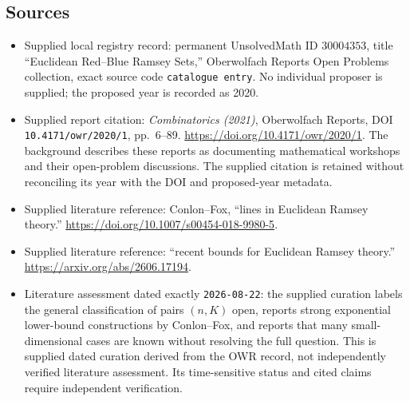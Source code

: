 \documentclass[11pt]{article}
\begin{document}
\subsection{Sources}
\begin{itemize}
\item Supplied local registry record: permanent UnsolvedMath ID \(30004353\), title ``Euclidean Red--Blue Ramsey Sets,'' Oberwolfach Reports Open Problems collection, exact source code \texttt{catalogue entry}. No individual proposer is supplied; the proposed year is recorded as 2020.
\item Supplied report citation: \emph{Combinatorics (2021)}, Oberwolfach Reports, DOI \texttt{10.4171/owr/2020/1}, pp.\ 6--89. \url{https://doi.org/10.4171/owr/2020/1}. The background describes these reports as documenting mathematical workshops and their open-problem discussions. The supplied citation is retained without reconciling its year with the DOI and proposed-year metadata.
\item Supplied literature reference: Conlon--Fox, ``lines in Euclidean Ramsey theory.'' \url{https://doi.org/10.1007/s00454-018-9980-5}.
\item Supplied literature reference: ``recent bounds for Euclidean Ramsey theory.'' \url{https://arxiv.org/abs/2606.17194}.
\item Literature assessment dated exactly \texttt{2026-08-22}: the supplied curation labels the general classification of pairs \((n,K)\) open, reports strong exponential lower-bound constructions by Conlon--Fox, and reports that many small-dimensional cases are known without resolving the full question. This is supplied dated curation derived from the OWR record, not independently verified literature assessment. Its time-sensitive status and cited claims require independent verification.
\end{itemize}
\end{document}
